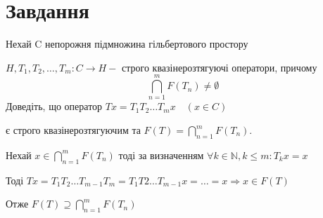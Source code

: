 
\chapter{Завдання \theHchapter}

\begin{tcolorbox}[title=Завдання]
    Нехай C непорожня підмножина гільбертового простору 
    
    
    $H, T_{1}, T_{2}, \ldots, T_{m}: C \rightarrow H-$ 
    строго квазінерозтягуючі оператори, причому 
    $$\bigcap_{n=1}^{m} F\left(T_{n}\right) \neq \emptyset$$
    Доведіть, що оператор
    $T x=T_{1} T_{2} \ldots T_{m} x \quad(x \in C)$


    є строго квазінерозтягуючим та 
    $F(T)=\bigcap\limits_{n=1}^{m} F\left(T_{n}\right)$.


\end{tcolorbox}



Нехай $x \in \bigcap\limits_{n=1}^mF(T_n)$ тоді за визначенням 
$\forall k \in \mathbb{N}, k \le m: T_kx = x$


Тоді $Tx = T_1T_2\dots T_{m-1}T_m = T_1T2\dots T_{m-1}x = \dots = x 
\Rightarrow x \in F(T)$ 


Отже $F(T) \supseteq \bigcap\limits_{n=1}^mF(T_n)$
